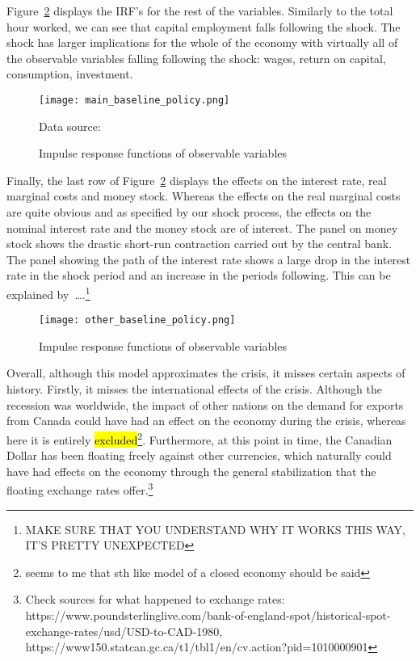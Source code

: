 \documentclass[12pt]{article}
\begin{document}
Figure~\ref{fig:other_baseline} displays the IRF's for the rest of the variables. Similarly to the total hour worked, we can see that capital employment falls following the shock. The shock has larger implications for the whole of the economy with virtually all of the observable variables falling following the shock: wages, return on capital, consumption, investment. 

\begin{figure}[!h]
    \caption{Impulse response functions of observable variables}\label{fig:main_baseline}
    \centering
    \texttt{[image: main\_baseline\_policy.png]}
    
    \tiny{Data source: \citeauthor{worldbank_inflation_ca}}
\end{figure}

Finally, the last row of Figure~\ref{fig:other_baseline} displays the effects on the interest rate, real marginal costs and money stock. Whereas the effects on the real marginal costs are quite obvious and as specified by our shock process, the effects on the nominal interest rate and the money stock are of interest. The panel on money stock shows the drastic short-run contraction carried out by the central bank. The panel showing the path of the interest rate shows a large drop in the interest rate in the shock period and an increase in the periods following. This can be explained by\ \dots.\footnote{MAKE SURE THAT YOU UNDERSTAND WHY IT WORKS THIS WAY, IT'S PRETTY UNEXPECTED}   

\begin{figure}[!h]
    \caption{Impulse response functions of observable variables}\label{fig:other_baseline}
    \centering
    \texttt{[image: other\_baseline\_policy.png]}
\end{figure}

Overall, although this model approximates the crisis, it misses certain aspects of history. Firstly, it misses the international effects of the crisis. Although the recession was worldwide, the impact of other nations on the demand for exports from Canada could have had an effect on the economy during the crisis, whereas here it is entirely \hl{excluded}\footnote{seems to me that sth like model of a closed economy should be said}. Furthermore, at this point in time, the Canadian Dollar has been floating freely against other currencies, which naturally could have had effects on the economy through the general stabilization that the floating exchange rates offer.\footnote{Check sources for what happened to exchange rates: https://www.poundsterlinglive.com/bank-of-england-spot/historical-spot-exchange-rates/usd/USD-to-CAD-1980, \\

https://www150.statcan.gc.ca/t1/tbl1/en/cv.action?pid=1010000901}
\end{document}
